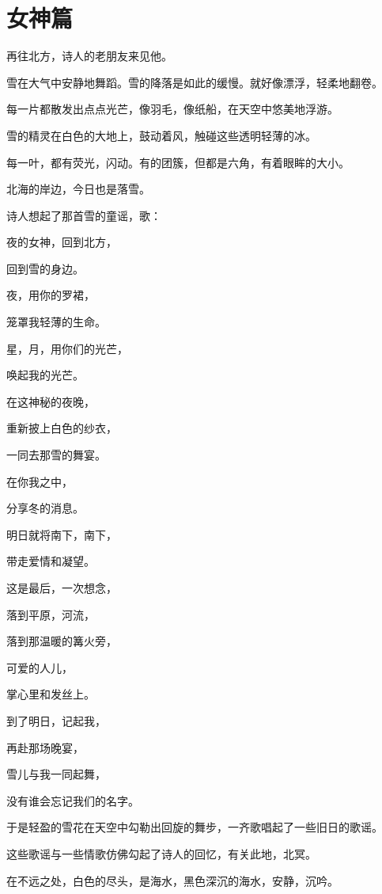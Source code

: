 \documentclass[UTF8]{article}
\begin{document}
\section{女神篇}
\par 再往北方，诗人的老朋友来见他。
\par 雪在大气中安静地舞蹈。雪的降落是如此的缓慢。就好像漂浮，轻柔地翻卷。
\par 每一片都散发出点点光芒，像羽毛，像纸船，在天空中悠美地浮游。
\par 雪的精灵在白色的大地上，鼓动着风，触碰这些透明轻薄的冰。
\par 每一叶，都有荧光，闪动。有的团簇，但都是六角，有着眼眸的大小。
\par 北海的岸边，今日也是落雪。
\\[0.6cm]
\par 诗人想起了那首雪的童谣，歌：
\\[0.6cm]
\par 夜的女神，回到北方，
\par 回到雪的身边。
\par 夜，用你的罗裙，
\par 笼罩我轻薄的生命。
\par 星，月，用你们的光芒，
\par 唤起我的光芒。
\par 在这神秘的夜晚，
\par 重新披上白色的纱衣，
\par 一同去那雪的舞宴。
\par 在你我之中，
\par 分享冬的消息。
\par 明日就将南下，南下，
\par 带走爱情和凝望。
\par 这是最后，一次想念，
\par 落到平原，河流，
\par 落到那温暖的篝火旁，
\par 可爱的人儿，
\par 掌心里和发丝上。
\par 到了明日，记起我，
\par 再赴那场晚宴，
\par 雪儿与我一同起舞，
\par 没有谁会忘记我们的名字。
\\[0.6cm]
\par 于是轻盈的雪花在天空中勾勒出回旋的舞步，一齐歌唱起了一些旧日的歌谣。
\par 这些歌谣与一些情歌仿佛勾起了诗人的回忆，有关此地，北冥。
\par 在不远之处，白色的尽头，是海水，黑色深沉的海水，安静，沉吟。
\end{document}
